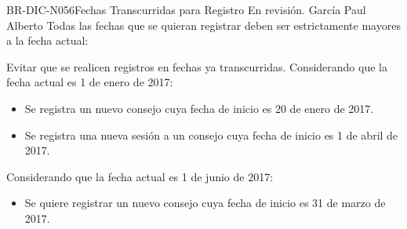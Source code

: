 %
\begin{BusinessRule}{BR-DIC-N056}{Fechas Transcurridas para Registro}
	{\bcCondition}    %
	{\btEnabler}     %
	{\blControlling}    %
	\BRItem[Estado] En revisión.
	 García Paul Alberto
	\BRItem[Descripción] Todas las fechas que se quieran registrar deben ser estrictamente mayores a la fecha actual:
	\BRItem[Sentencia] 	\cdtEmpty
	
	
	
	\BRItem[Motivación] Evitar que se realicen registros en fechas ya transcurridas.
	 Considerando que la fecha actual es 1 de enero de 2017: 
	\begin{itemize}
		\item Se registra un nuevo consejo cuya fecha de inicio es 20 de enero de 2017.
		\item Se registra una nueva sesión a un consejo cuya fecha de inicio es 1 de abril de 2017.
	\end{itemize}
	 Considerando que la fecha actual es 1 de junio de 2017:
	\begin{itemize}
		\item Se quiere registrar un nuevo consejo cuya fecha de inicio es 31 de marzo de 2017.
		
	\end{itemize}	
	
\end{BusinessRule}
